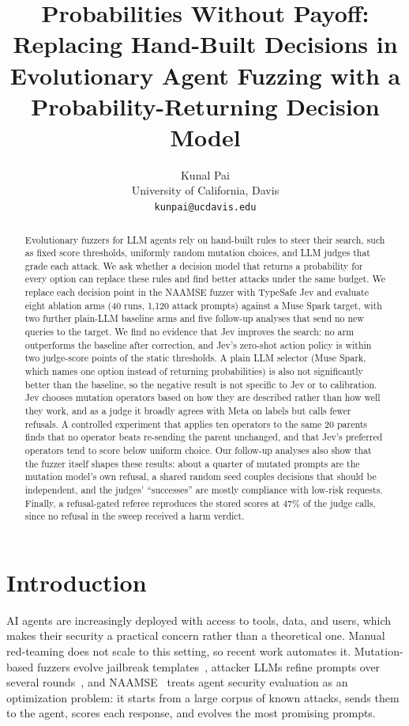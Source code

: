 \documentclass{article}
\title{Probabilities Without Payoff: Replacing Hand-Built Decisions in Evolutionary Agent Fuzzing with a Probability-Returning Decision Model}
\author{%
  Kunal Pai \\
  University of California, Davis \\
  \texttt{kunpai@ucdavis.edu} \\
}
\begin{document}
\maketitle

\begin{abstract}
Evolutionary fuzzers for LLM agents rely on hand-built rules to steer their search, such as fixed score thresholds, uniformly random mutation choices, and LLM judges that grade each attack.
We ask whether a decision model that returns a probability for every option can replace these rules and find better attacks under the same budget.
We replace each decision point in the NAAMSE fuzzer with TypeSafe Jev and evaluate eight ablation arms (40 runs, 1{,}120 attack prompts) against a Muse Spark target, with two further plain-LLM baseline arms and five follow-up analyses that send no new queries to the target.
We find no evidence that Jev improves the search: no arm outperforms the baseline after correction, and Jev's zero-shot action policy is within two judge-score points of the static thresholds.
A plain LLM selector (Muse Spark, which names one option instead of returning probabilities) is also not significantly better than the baseline, so the negative result is not specific to Jev or to calibration.
Jev chooses mutation operators based on how they are described rather than how well they work, and as a judge it broadly agrees with Meta on labels but calls fewer refusals.
A controlled experiment that applies ten operators to the same 20 parents finds that no operator beats re-sending the parent unchanged, and that Jev's preferred operators tend to score below uniform choice.
Our follow-up analyses also show that the fuzzer itself shapes these results: about a quarter of mutated prompts are the mutation model's own refusal, a shared random seed couples decisions that should be independent, and the judges' ``successes'' are mostly compliance with low-risk requests.
Finally, a refusal-gated referee reproduces the stored scores at 47\% of the judge calls, since no refusal in the sweep received a harm verdict.
\end{abstract}

\section{Introduction}
\label{sec:intro}

AI agents are increasingly deployed with access to tools, data, and users, which makes their security a practical concern rather than a theoretical one.
Manual red-teaming does not scale to this setting, so recent work automates it.
Mutation-based fuzzers evolve jailbreak templates~\citep{yu2024llmfuzzer}, attacker LLMs refine prompts over several rounds~\citep{chao2025pair}, and NAAMSE~\citep{pai2026naamse} treats agent security evaluation as an optimization problem: it starts from a large corpus of known attacks, sends them to the agent, scores each response, and evolves the most promising prompts.
\end{document}
